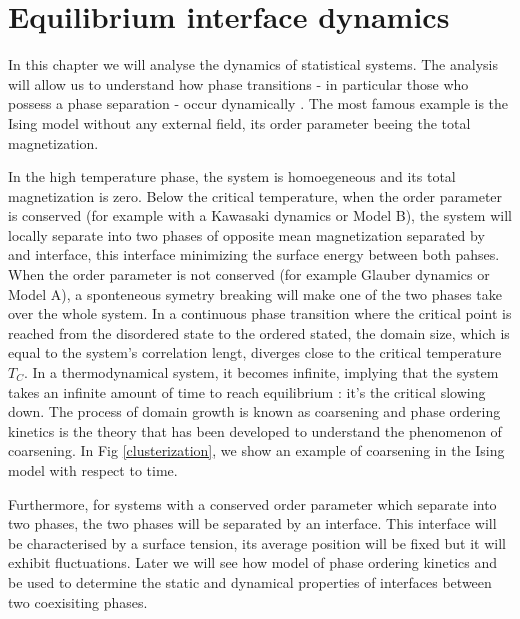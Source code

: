 \chapter{Equilibrium interface dynamics}

In this chapter we will analyse the dynamics of statistical systems. The analysis will allow us to understand how phase transitions - in particular those who possess a phase separation - occur dynamically \cite{hohenberg_theory_1977}. The most famous example is the Ising model without any external field, its order parameter beeing the total magnetization. 

In the high temperature phase, the system is homoegeneous and its total magnetization is zero. Below the critical temperature, when the order parameter is conserved (for example with a Kawasaki dynamics or Model B), the system will locally separate into two phases of opposite mean magnetization separated by and interface, this interface minimizing the surface energy between both pahses.
When the order parameter is not conserved (for example Glauber dynamics or Model A), a sponteneous symetry breaking will make one of the two phases take over the whole system. In a continuous phase transition where the critical point is reached from the disordered state to the ordered stated, the domain size, which is equal to the system's correlation lengt, diverges close to the critical temperature $T_C$. In a thermodynamical system, it becomes infinite, implying that the system takes an infinite amount of time to reach equilibrium : it's the critical slowing down. The process of domain growth is known as coarsening and phase ordering kinetics is the theory that has been developed to understand the phenomenon of coarsening\cite{bray_theory_1994}. {\color{purple} In Fig \ref{clusterization}, we show an example of coarsening in the Ising model with respect to time.}

Furthermore, for systems with a conserved order parameter which separate into two phases, the two phases will be separated by an interface. This interface will be characterised by a surface tension, its average position will be fixed but it will exhibit fluctuations. Later we will see how model of phase ordering kinetics and be used to determine the static and dynamical properties of interfaces between two coexisiting phases. 

